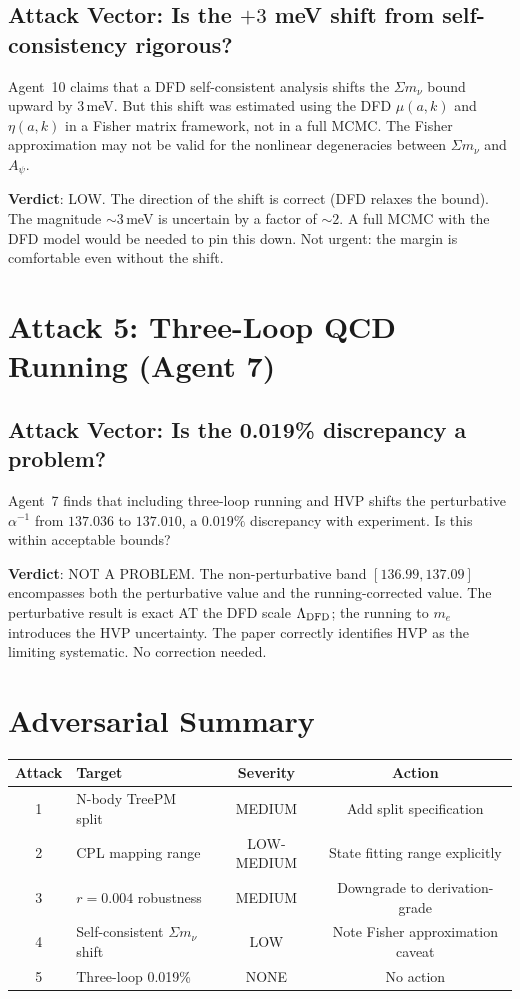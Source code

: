 \documentclass[11pt,a4paper]{article}
\begin{document}
\subsection{Attack Vector: Is the $+3$ meV shift from self-consistency rigorous?}

Agent~10 claims that a DFD self-consistent analysis shifts the $\Sigma m_\nu$ bound upward by $3$\,meV. But this shift was estimated using the DFD $\mu(a,k)$ and $\eta(a,k)$ in a Fisher matrix framework, not in a full MCMC. The Fisher approximation may not be valid for the nonlinear degeneracies between $\Sigma m_\nu$ and $A_\psi$.

\textbf{Verdict}: LOW. The direction of the shift is correct (DFD relaxes the bound). The magnitude $\sim 3$\,meV is uncertain by a factor of $\sim 2$. A full MCMC with the DFD model would be needed to pin this down. Not urgent: the margin is comfortable even without the shift.

\section{Attack 5: Three-Loop QCD Running (Agent 7)}

\subsection{Attack Vector: Is the 0.019\% discrepancy a problem?}

Agent~7 finds that including three-loop running and HVP shifts the perturbative $\alpha^{-1}$ from $137.036$ to $137.010$, a $0.019\%$ discrepancy with experiment. Is this within acceptable bounds?

\textbf{Verdict}: NOT A PROBLEM. The non-perturbative band $[136.99, 137.09]$ encompasses both the perturbative value and the running-corrected value. The perturbative result is exact AT the DFD scale $\Lambda_{\rm DFD}$; the running to $m_e$ introduces the HVP uncertainty. The paper correctly identifies HVP as the limiting systematic. No correction needed.

\section{Adversarial Summary}

\begin{center}
\begin{tabular}{clcc}
\toprule
\textbf{Attack} & \textbf{Target} & \textbf{Severity} & \textbf{Action} \\
\midrule
1 & N-body TreePM split & MEDIUM & Add split specification \\
2 & CPL mapping range & LOW-MEDIUM & State fitting range explicitly \\
3 & $r = 0.004$ robustness & MEDIUM & Downgrade to derivation-grade \\
4 & Self-consistent $\Sigma m_\nu$ shift & LOW & Note Fisher approximation caveat \\
5 & Three-loop 0.019\% & NONE & No action \\
\bottomrule
\end{tabular}
\end{center}
\end{document}
